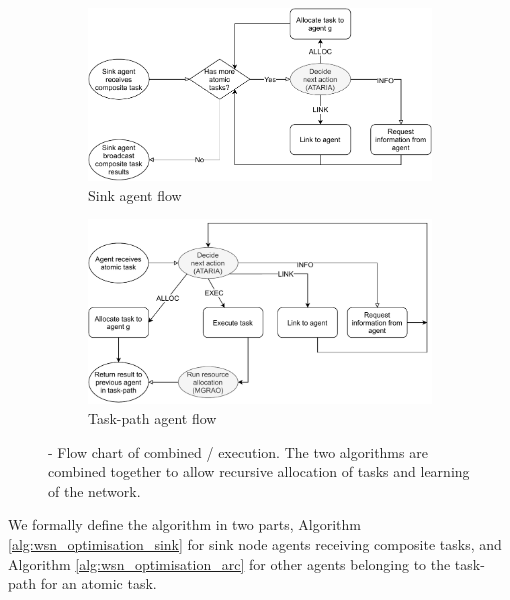 \begin{figure}[ht]
	\centering
	\begin{subfigure}{.49\textwidth}
		\centering
		\includegraphics[width=0.9\linewidth, trim={25pt 0pt 25pt 0pt, clip}]{algorithm-flow-sink}
		\caption{Sink agent flow}
		\label{fig:algorithm-flow-sink}
	\end{subfigure} \hfill%
	\begin{subfigure}{.49\textwidth}
		\centering	\includegraphics[width=0.9\linewidth,trim={25pt 0pt 25pt 0pt, clip}]{algorithm-flow-arc}
		\caption{Task-path agent flow}
		\label{fig:algorithm-flow-arc}
	\end{subfigure}
	\caption{\textbf{\acronymWSNOptimisation{}{}} - Flow chart of combined \acronymATARIA{}{}/\acronymMGRAO{}{} execution. The two algorithms are combined together to allow recursive allocation of tasks and learning of the network.}
	\label{fig:algorithm-flow}
\end{figure}
We formally define the \acronymWSNOptimisation{}{} algorithm in two parts, Algorithm \ref{alg:wsn_optimisation_sink} for sink node agents receiving composite tasks, and Algorithm \ref{alg:wsn_optimisation_arc} for other agents belonging to the task-path for an atomic task.

